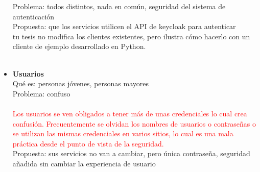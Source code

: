 \begin{itemize}
	Problema: todos distintos, nada en común, seguridad del sistema de autenticación\\
	Propuesta: que los servicios utilicen el API de keycloak para autenticar\\
	tu tesis no modifica los clientes existentes, pero ilustra cómo hacerlo con un cliente de ejemplo desarrollado en Python.\\
	\\
	\item \textbf{Usuarios}\\
	Qué es: personas jóvenes, personas mayores\\
	Problema: confuso\\
	\\
	\textcolor{red}{Los usuarios se ven obligados a tener más de unas credenciales lo cual crea confusión. Frecuentemente se olvidan los nombres de usuarios o contraseñas o se utilizan las mismas credenciales en varios sitios, lo cual es una mala práctica desde el punto de vista de la seguridad.}
	\\
	Propuesta: sus servicios no van a cambiar, pero única contraseña, seguridad añadida sin cambiar la experiencia de usuario
	
\end{itemize} 

